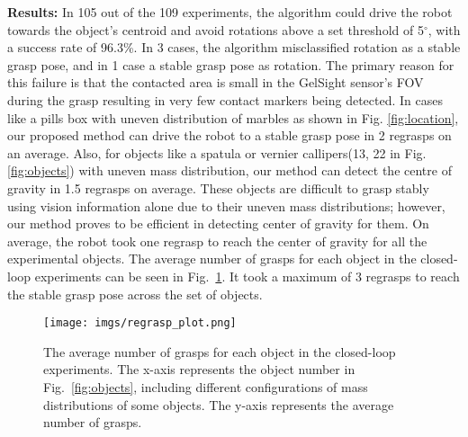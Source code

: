 \textbf{Results: }
In 105 out of the 109 experiments, the algorithm could drive the robot towards the object's centroid and avoid rotations above a set threshold of 5$^{\circ}$, with a success rate of 96.3\%. In 3 cases, the algorithm misclassified rotation as a stable grasp pose, and in 1 case a stable grasp pose as rotation. The primary reason for this failure is that the contacted area is small in the GelSight sensor's FOV during the grasp resulting in very few contact markers being detected. In cases like a pills box with uneven distribution of marbles as shown in Fig. \ref{fig:location}, our proposed method can drive the robot to a stable grasp pose in 2 regrasps on an average. Also, for objects like a spatula or vernier callipers(13, 22 in Fig. \ref{fig:objects}) 
with uneven mass distribution, our method can detect the centre of gravity in 1.5 regrasps on average. These objects are difficult to grasp stably using vision information alone due to their uneven mass distributions; however, our method proves to be efficient in detecting center of gravity for them. On average, the robot took one regrasp to reach the center of gravity for all the experimental objects. The average number of grasps for each object in the closed-loop experiments can be seen in Fig.~\ref{fig:regrasp}. It took a maximum of 3 regrasps to reach the stable grasp pose across the set of objects. 


\begin{figure}[!htbp]
    \centering
    \texttt{[image: imgs/regrasp\_plot.png]}
    \caption{The average number of grasps for each object in the closed-loop experiments. The x-axis represents the object number in Fig.~\ref{fig:objects}, including different configurations of mass distributions of some objects. The y-axis represents the average number of grasps.}
    \label{fig:regrasp}
     \vspace{-2mm}
\end{figure}

